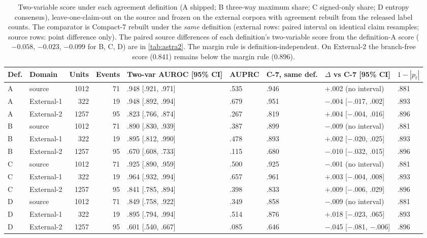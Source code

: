 \documentclass[11pt]{article}
\newcommand{\compact}{Compact-7\xspace}
\begin{document}
\begin{table}[!t]\centering\scriptsize
\setlength{\tabcolsep}{3pt}
\begin{tabular}{@{}llrrlllll@{}}
\toprule
Def. & Domain & Units & Events & Two-var AUROC [95\% CI] & AUPRC & C-7, same def. & $\Delta$ vs C-7 [95\% CI] & $1-|p_t|$ \\
\midrule
A & source & 1012 & 71 & .948 [.921, .971] & .535 & .946 & $+$.002 (no interval) & .881 \\
A & External-1 & 322 & 19 & .948 [.892, .994] & .679 & .951 & $-$.004 [$-$.017, .002] & .893 \\
A & External-2 & 1257 & 95 & .823 [.766, .874] & .267 & .819 & $+$.004 [$-$.004, .016] & .896 \\
B & source & 1012 & 71 & .890 [.830, .939] & .387 & .899 & $-$.009 (no interval) & .881 \\
B & External-1 & 322 & 19 & .895 [.812, .990] & .478 & .893 & $+$.002 [$-$.020, .025] & .893 \\
B & External-2 & 1257 & 95 & .670 [.608, .733] & .115 & .680 & $-$.010 [$-$.032, .015] & .896 \\
C & source & 1012 & 71 & .925 [.890, .959] & .500 & .925 & $-$.001 (no interval) & .881 \\
C & External-1 & 322 & 19 & .964 [.932, .994] & .657 & .961 & $+$.003 [$-$.004, .008] & .893 \\
C & External-2 & 1257 & 95 & .841 [.785, .894] & .398 & .833 & $+$.009 [$-$.006, .029] & .896 \\
D & source & 1012 & 71 & .849 [.758, .922] & .349 & .858 & $-$.009 (no interval) & .881 \\
D & External-1 & 322 & 19 & .895 [.794, .994] & .514 & .876 & $+$.018 [$-$.023, .065] & .893 \\
D & External-2 & 1257 & 95 & .601 [.540, .667] & .085 & .646 & $-$.045 [$-$.081, $-$.006] & .896 \\
\bottomrule
\end{tabular}
\caption{Two-variable score under each agreement definition (A shipped; B three-way maximum share;
C signed-only share; D entropy consensus), leave-one-claim-out on the source and frozen on the
external corpora with agreement rebuilt from the released label counts. The comparator is
\compact rebuilt under the \emph{same} definition (external rows: paired interval on identical
claim resamples; source rows: point difference only). The paired source differences of each
definition's two-variable score from the definition-A score ($-0.058$, $-0.023$, $-0.099$ for B, C,
D) are in \cref{tab:astra2}. The margin rule is definition-independent. On External-2 the
branch-free score (0.841) remains below the margin rule (0.896).}
\label{tab:astra5}
\end{table}
\end{document}

